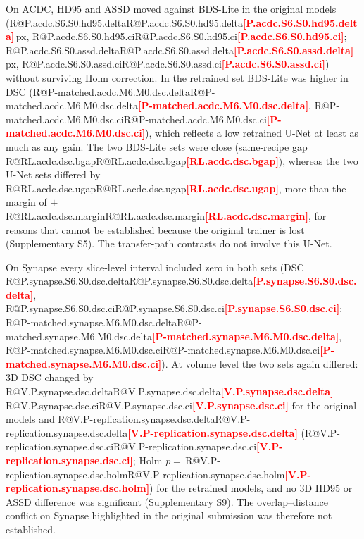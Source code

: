 \documentclass[fleqn,10pt,lineno]{wlpeerj}
\makeatletter
\newcommand{\R}[1]{\ifcsname R@#1\endcsname\csname R@#1\endcsname\else\textbf{\textcolor{red}{[#1]}}\fi}
\makeatother
\begin{document}
On ACDC, HD95 and ASSD moved against BDS-Lite in the original models (\R{P.acdc.S6.S0.hd95.delta}\,px, \R{P.acdc.S6.S0.hd95.ci}; \R{P.acdc.S6.S0.assd.delta}\,px, \R{P.acdc.S6.S0.assd.ci}) without surviving Holm correction. In the retrained set BDS-Lite was higher in DSC (\R{P-matched.acdc.M6.M0.dsc.delta}, \R{P-matched.acdc.M6.M0.dsc.ci}), which reflects a low retrained U-Net at least as much as any gain. The two BDS-Lite sets were close (same-recipe gap \R{RL.acdc.dsc.bgap}), whereas the two U-Net sets differed by \R{RL.acdc.dsc.ugap}, more than the margin of $\pm$\R{RL.acdc.dsc.margin}, for reasons that cannot be established because the original trainer is lost (Supplementary S5). The transfer-path contrasts do not involve this U-Net.

On Synapse every slice-level interval included zero in both sets (DSC \R{P.synapse.S6.S0.dsc.delta}, \R{P.synapse.S6.S0.dsc.ci}; \R{P-matched.synapse.M6.M0.dsc.delta}, \R{P-matched.synapse.M6.M0.dsc.ci}). At volume level the two sets again differed: 3D DSC changed by \R{V.P.synapse.dsc.delta} \R{V.P.synapse.dsc.ci} for the original models and \R{V.P-replication.synapse.dsc.delta} (\R{V.P-replication.synapse.dsc.ci}; Holm $p=$\,\R{V.P-replication.synapse.dsc.holm}) for the retrained models, and no 3D HD95 or ASSD difference was significant (Supplementary S9). The overlap--distance conflict on Synapse highlighted in the original submission was therefore not established.

\begin{table}[ht]
\centering
\resizebox{\linewidth}{!}{}
\caption{\label{tab:twosets}BDS-Lite versus U-Net in the two three-seed model sets. Mean $\pm$ SD over three seeds of image- or slice-level values; $\Delta$ is the unit-weighted paired difference with distance differences negated, so positive favors BDS-Lite, and it need not equal the difference of the means shown. ISIC2018: official test set; the ten-seed results in Table~\ref{tab:tencontrasts} supersede the retrained row. $^{*}$Holm $p<0.05$ with an interval excluding zero. Run-level margin: see Statistical analysis. Values differ from the original Table~2 because classes absent from both masks are no longer scored as perfect.}
\end{table}
\end{document}

